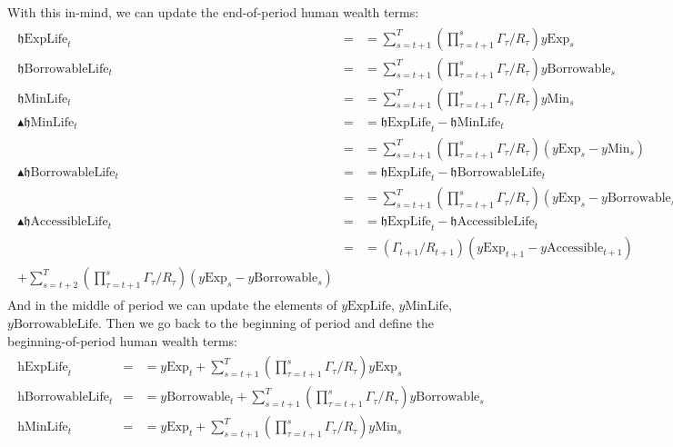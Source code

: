 \documentclass[titlepage,abstract]{\econtex}
\providecommand{\hExpLife}{\mathrm{h}\text{ExpLife}}
\providecommand{\hMinLife}{\mathrm{h}\text{MinLife}}
\providecommand{\hBorrowableLife}{\mathrm{h}\text{BorrowableLife}}
\providecommand{\hEndExpLife}{\mathfrak{h}\text{ExpLife}}
\providecommand{\hEndMinLife}{\mathfrak{h}\text{MinLife}}
\providecommand{\hEndBorrowableLife}{\mathfrak{h}\text{BorrowableLife}}
\providecommand{\hEndAccessibleLife}{\mathfrak{h}\text{AccessibleLife}}
\providecommand{\DeltahEndMinLife}{\blacktriangle \mathfrak{h}\text{MinLife}}
\providecommand{\DeltahEndBorrowableLife}{\blacktriangle \mathfrak{h}\text{BorrowableLife}}
\providecommand{\DeltahEndAccessibleLife}{\blacktriangle \mathfrak{h}\text{AccessibleLife}}
\providecommand{\yMinLife}{y\text{MinLife}}
\providecommand{\yBorrowableLife}{y\text{BorrowableLife}}
\providecommand{\yExpLife}{y\text{ExpLife}}
\providecommand{\yMin}{y\text{Min}}
\providecommand{\yBorrowable}{y\text{Borrowable}}
\providecommand{\yAccessible}{y\text{Accessible}}
\providecommand{\yExp}{y\text{Exp}}
\begin{document}
With this in-mind, we can update the end-of-period human wealth terms:
\begin{equation}\begin{gathered}\begin{aligned}
          \hEndExpLife_{t}  &=& =  \sum_{s=t+1}^{T} (\prod_{\tau=t+1}^{s}\Gamma_{\tau} /R_{\tau}) \yExp_{s} \\
          \hEndBorrowableLife_{t}  &=& =  \sum_{s=t+1}^{T} (\prod_{\tau=t+1}^{s}\Gamma_{\tau}/R_{\tau}) \yBorrowable_{s} \\
          \hEndMinLife_{t}  &=& =  \sum_{s=t+1}^{T} (\prod_{\tau=t+1}^{s}\Gamma_{\tau}/R_{\tau}) \yMin_{s} \\
          \DeltahEndMinLife_{t}  &=& =  \hEndExpLife_{t} -  \hEndMinLife_{t}\\
                           &=& =  \sum_{s=t+1}^{T} (\prod_{\tau=t+1}^{s}\Gamma_{\tau}/R_{\tau}) (\yExp_{s}-\yMin_{s}) \\
          \DeltahEndBorrowableLife_{t}  &=& =  \hEndExpLife_{t} -  \hEndBorrowableLife_{t}\\
                           &=& =  \sum_{s=t+1}^{T} (\prod_{\tau=t+1}^{s}\Gamma_{\tau}/R_{\tau}) (\yExp_{s}-\yBorrowable_{s}) \\
          \DeltahEndAccessibleLife_{t}  &=& =  \hEndExpLife_{t} -  \hEndAccessibleLife_{t}\\
                           &=& =  (\Gamma_{t+1}/R_{t+1}) (\yExp_{t+1}-\yAccessible_{t+1}) \\
                            +\sum_{s=t+2}^{T} (\prod_{\tau=t+1}^{s}\Gamma_{\tau}/R_{\tau}) (\yExp_{s}-\yBorrowable_{s})
\end{aligned}\end{gathered}\end{equation}
And in the middle of period we can update the elements of $\yExpLife$, $\yMinLife$, $\yBorrowableLife$. Then we go back to the beginning of period and define the beginning-of-period human wealth terms:
\begin{equation}\begin{gathered}\begin{aligned}
          \hExpLife_{t}  &=& =  \yExp_{t} + \sum_{s=t+1}^{T} (\prod_{\tau=t+1}^{s}\Gamma_{\tau} /R_{\tau}) \yExp_{s} \\
          \hBorrowableLife_{t}  &=& =  \yBorrowable_{t} + \sum_{s=t+1}^{T} (\prod_{\tau=t+1}^{s}\Gamma_{\tau}/R_{\tau}) \yBorrowable_{s} \\
          \hMinLife_{t}  &=& =  \yExp_{t} +\sum_{s=t+1}^{T} (\prod_{\tau=t+1}^{s}\Gamma_{\tau}/R_{\tau}) \yMin_{s}
\end{aligned}\end{gathered}\end{equation}
\end{document}
